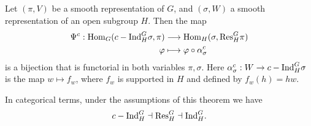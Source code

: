 \begin{thm}\label{thm:frob2}
	Let $(\pi,V)$ be a smooth representation of $G$, and $(\sigma,W)$ a smooth representation of an open subgroup $H$. Then the map 
	\begin{align*}
		\Psi^c:\mathrm{Hom}_G(c-\mathrm{Ind}_H^G \sigma, \pi)&\longrightarrow \mathrm{Hom}_H(\sigma, \mathrm{Res}_H^G\pi)\\
		\varphi &\longmapsto \varphi \circ \alpha^c_\sigma 
	\end{align*}
    is a bijection that is functorial in both variables $\pi,\sigma$. Here $\alpha^c_\sigma: W\to c-\mathrm{Ind}_H^G \sigma$ is the map $w\mapsto f_w$, where $f_w$ is supported in $H$ and defined by $f_w(h) = hw$.
\end{thm}
In categorical terms, under the assumptions of this theorem we have
$$c-\mathrm{Ind}_H^G\dashv\mathrm{Res}_H^G\dashv\mathrm{Ind}_H^G.$$